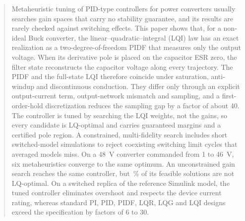 \begin{abstract}
Metaheuristic tuning of PID-type controllers for power converters usually
searches gain spaces that carry no stability guarantee, and its results are
rarely checked against switching effects. This paper shows that, for a
non-ideal Buck converter, the linear--quadratic--integral (LQI) law has an
exact realization as a two-degree-of-freedom PIDF that measures only the output
voltage. When its derivative pole is placed on the capacitor ESR zero, the
filter state reconstructs the capacitor voltage along every trajectory. The
PIDF and the full-state LQI therefore coincide under saturation, anti-windup
and discontinuous conduction. They differ only through an explicit
output-current term, output-network mismatch and sampling, and a first-order-hold
discretization reduces the sampling gap by a factor of about 40. The controller
is tuned by searching the LQI weights, not the gains, so every candidate is
LQ-optimal and carries guaranteed margins and a certified pole region. A
constrained, multi-fidelity search includes short switched-model simulations to
reject coexisting switching limit cycles that averaged models miss. On a
\SI{48}{V} converter commanded from 1 to \SI{46}{V}, six metaheuristics converge
to the same optimum. An unconstrained gain search reaches the same controller,
but \IOpct\,\% of its feasible solutions are not LQ-optimal. On a switched
replica of the reference Simulink model, the tuned controller eliminates
overshoot and respects the device current rating, whereas standard PI, PID,
PIDF, LQR, LQG and LQI designs exceed the specification by factors of 6 to 30.
\end{abstract}
